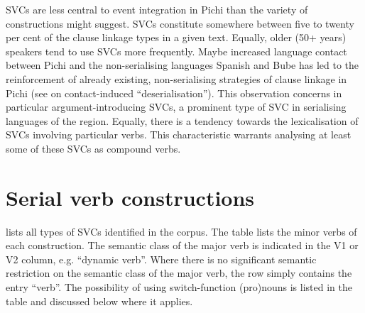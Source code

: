 SVCs are less central to event integration in Pichi than the variety of constructions might suggest. SVCs constitute somewhere between five to twenty per cent of the clause linkage types in a given text. Equally, older (50+ years) speakers tend to use \textsc{SVC}s more frequently. Maybe increased language contact between Pichi and the non-serialising languages Spanish and Bube has led to the reinforcement of already existing, non-serialising strategies of clause linkage in Pichi (see \citealt{Hajek2006} on contact-induced “deserialisation”). This observation concerns in particular argument-introducing SVCs, a prominent type of SVC in serialising languages of the region. Equally, there is a tendency towards the lexicalisation of SVCs involving particular verbs. This characteristic warrants analysing at least some of these SVCs as compound verbs\index{}. 


\section{Serial verb constructions}\label{sec:11.2}

 lists all types of SVCs identified in the corpus. The table lists the minor verbs of each construction. The semantic class of the major verb is indicated in the V1 or V2 column, e.g. “dynamic verb”. Where there is no significant semantic restriction on the semantic class of the major verb, the row simply contains the entry “verb”. The possibility of using switch-function (pro)nouns is listed in the table and discussed below where it applies.

